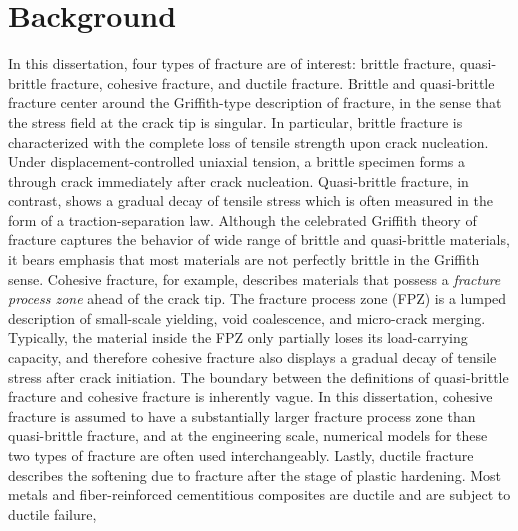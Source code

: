 \section{Background}

In this dissertation, four types of fracture are of interest: brittle fracture, quasi-brittle fracture, cohesive fracture, and ductile fracture. Brittle and quasi-brittle fracture center around the Griffith-type description of fracture, in the sense that the stress field at the crack tip is singular. In particular, brittle fracture is characterized with the complete loss of tensile strength upon crack nucleation. Under displacement-controlled uniaxial tension, a brittle specimen forms a through crack immediately after crack nucleation. Quasi-brittle fracture, in contrast, shows a gradual decay of tensile stress which is often measured in the form of a traction-separation law. Although the celebrated Griffith theory of fracture captures the behavior of wide range of brittle and quasi-brittle materials, it bears emphasis that most materials are not perfectly brittle in the Griffith sense. Cohesive fracture, for example, describes materials that possess a \emph{fracture process zone} ahead of the crack tip. The fracture process zone (FPZ) is a lumped description of small-scale yielding, void coalescence, and micro-crack merging. Typically, the material inside the FPZ only partially loses its load-carrying capacity, and therefore cohesive fracture also displays a gradual decay of tensile stress after crack initiation. The boundary between the definitions of quasi-brittle fracture and cohesive fracture is inherently vague. In this dissertation, cohesive fracture is assumed to have a substantially larger fracture process zone than quasi-brittle fracture, and at the engineering scale, numerical models for these two types of fracture are often used interchangeably. Lastly, ductile fracture describes the softening due to fracture after the stage of plastic hardening. Most metals and fiber-reinforced cementitious composites are ductile and are subject to ductile failure,

